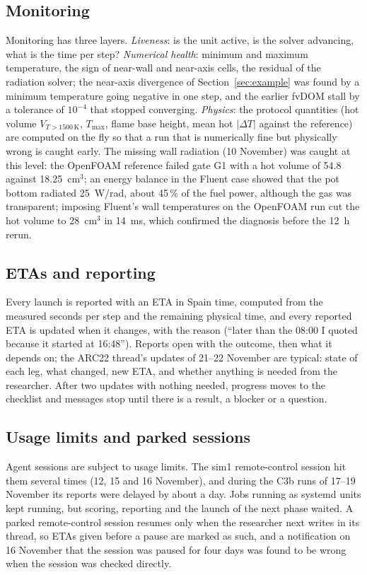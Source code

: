 \documentclass[preprint,review,12pt]{elsarticle}
\begin{document}
\subsection{Monitoring}
Monitoring has three layers. \emph{Liveness}: is the unit active, is the solver advancing, what is the time per step?
\emph{Numerical health}: minimum and maximum temperature, the sign of near-wall and near-axis cells, the residual of the
radiation solver; the near-axis divergence of Section~\ref{sec:example} was found by a minimum temperature going
negative in one step, and the earlier fvDOM stall by a tolerance of $10^{-4}$ that stopped converging. \emph{Physics}:
the protocol quantities (hot volume $V_{T>1500\,\mathrm{K}}$, $T_{\max}$, flame base height, mean hot $|\Delta T|$
against the reference) are computed on the fly so that a run that is numerically fine but physically wrong is caught
early. The missing wall radiation (10 November) was caught at this level: the OpenFOAM reference failed gate G1 with a
hot volume of 54.8 against 18.25~cm$^3$; an energy balance in the Fluent case showed that the pot bottom radiated
25~W/rad, about 45\,\% of the fuel power, although the gas was transparent; imposing Fluent's wall temperatures on the
OpenFOAM run cut the hot volume to 28~cm$^3$ in 14~ms, which confirmed the diagnosis before the 12~h rerun.

\subsection{ETAs and reporting}
Every launch is reported with an ETA in Spain time, computed from the measured seconds per step and the remaining
physical time, and every reported ETA is updated when it changes, with the reason (``later than the 08:00 I quoted
because it started at 16:48''). Reports open with the outcome, then what it depends on; the ARC22 thread's updates of
21--22 November are typical: state of each leg, what changed, new ETA, and whether anything is needed from the
researcher. After two updates with nothing needed, progress moves to the checklist and messages stop until there is a
result, a blocker or a question.

\subsection{Usage limits and parked sessions}
Agent sessions are subject to usage limits. The sim1 remote-control session hit them several times (12, 15 and 16
November), and during the C3b runs of 17--19 November its reports were delayed by about a day. Jobs running as systemd units kept running, but
scoring, reporting and the launch of the next phase waited. A parked remote-control session resumes only when the
researcher next writes in its thread, so ETAs given before a pause are marked as such, and a notification on 16 November that the
session was paused for four days was found to be wrong when the session was checked directly.
\end{document}
